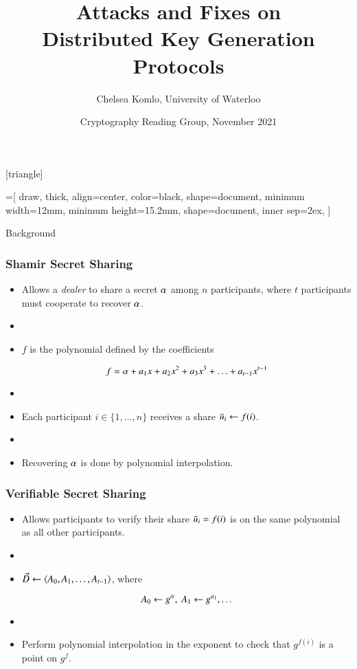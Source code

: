 \documentclass[hyperref={pdfpagelabels=true},table,dvipsnames,14pt,aspectratio=169]{beamer}
\title{Attacks and Fixes on \\ Distributed Key Generation Protocols}
\author{Chelsea Komlo, University of Waterloo}
\date[November 2021]{ Cryptography Reading Group, November 2021}
\begin{document}
[triangle]

=[%
draw,
thick,
align=center,
color=black,
shape=document,
minimum width=12mm,
minimum height=15.2mm,
shape=document,
inner sep=2ex,
]

\begin{frame}
        \thispagestyle{empty}
        \maketitle
\end{frame}

\begin{frame}
  \huge
  \centering
  Background
\end{frame}

\begin{frame}
  \frametitle{Shamir Secret Sharing}

  \begin{itemize}
    \item<1-> Allows a \emph{dealer} to share a secret $\alpha$ among $n$ participants, where $t$ participants must cooperate to recover $\alpha$.
    \item[]
    \item<2-> $f$ is the polynomial defined by the coefficients

      \[f = \alpha + a_1 x + a_2 x^2 + a_3 x^3 + \ldots + a_{t-1}x^{t-1}  \]

    \item[]
    \item<3-> Each participant $i \in \{1, \ldots, n \}$ receives a share $\bar{u}_i \gets f(i) $.
    \item[]
    \item<4-> Recovering $\alpha$ is done by polynomial interpolation.
  \end{itemize}
\end{frame}

\begin{frame}
  \frametitle{Verifiable Secret Sharing}

  \begin{itemize}
    \item<1-> Allows participants to verify their share $\bar{u}_i = f(i)$ is on the same polynomial as all other participants.
    \item[]
    \item<2-> $\vec{D} \gets \langle A_0, A_1, \ldots, A_{t-1}  \rangle$, where

      \[ A_0 \gets g^{\alpha},\ A_1 \gets g^{a_1}, \ldots \]
    \item[]
    \item<3-> Perform polynomial interpolation in the exponent to check that $g^{f(i)}$ is a point on $g^f$.
  \end{itemize}
\end{frame}
\end{document}
